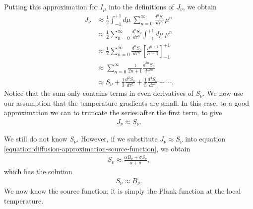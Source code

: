 Putting this approximation for $I_\mu$ into the definitions of $J_\nu$, we obtain
\begin{align}
J_\nu &\approx 
\frac{1}{2}\int_{-1}^{+1}\!\!\!d\mu\:\sum_{n=0}^\infty \frac{d^n S_\nu}{d\tau^n} \mu^n\\
&\approx
\frac{1}{2}\sum_{n=0}^\infty \frac{d^n S_\nu}{d\tau^n} \int_{-1}^{+1}\!\!\!d\mu\:\mu^n\\
&\approx\frac{1}{2}\sum_{n=0}^\infty \frac{d^n S_\nu}{d\tau^n} \left[\frac{\mu^{n+1}}{n+1}\right]_{-1}^{+1}\\
&\approx \sum_{n=0}^\infty \frac{1}{2n+1}\frac{d^{2n} S_\nu}{d\tau^{2n}}\\
&\approx S_\nu + \frac{1}{3}\frac{d^2 S_\nu}{d\tau^2} + \frac{1}{5}\frac{d^4 S_\nu}{d\tau^4}
+ \cdots.
\end{align}
Notice that the sum only contains terms in even derivatives of $S_\nu$.
We now use our assumption that the temperature gradients are small. In this case, 
to a good
approximation we can to truncate the series after the
first term, to give
\begin{align}
J_\nu \approx S_\nu.
\end{align}

We still do not know $S_\nu$. However, if we substitute $J_\nu \approx S_\nu$ into 
equation \ref{equation:diffusion-approximation-source-function}, we obtain
\begin{align}
S_\nu \approx \frac{\alpha B_\nu + \sigma S_\nu}{\alpha + \sigma},
\end{align}
which has the solution
\begin{align}
S_\nu \approx B_\nu.
\end{align}
We now know the source function; it is simply the Plank function at the local temperature.

